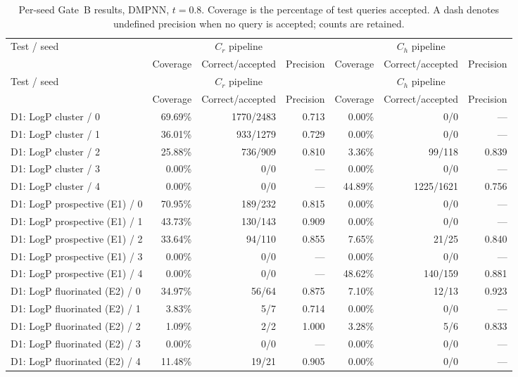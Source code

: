 \begin{longtable}{@{}lrrrrrr@{}}
\caption{Per-seed Gate~B results, DMPNN, $t=0.8$. Coverage is the percentage of test queries accepted. A dash denotes undefined precision when no query is accepted; counts are retained.}\\
\toprule
Test / seed & \multicolumn{3}{c}{$C_r$ pipeline} & \multicolumn{3}{c}{$C_h$ pipeline} \\
 & Coverage & Correct/accepted & Precision & Coverage & Correct/accepted & Precision \\
\midrule
\endfirsthead
\toprule
Test / seed & \multicolumn{3}{c}{$C_r$ pipeline} & \multicolumn{3}{c}{$C_h$ pipeline} \\
 & Coverage & Correct/accepted & Precision & Coverage & Correct/accepted & Precision \\
\midrule
\endhead
\bottomrule
\endfoot
D1: LogP cluster / 0 & 69.69\% & 1770/2483 & 0.713 & 0.00\% & 0/0 & --- \\
D1: LogP cluster / 1 & 36.01\% & 933/1279 & 0.729 & 0.00\% & 0/0 & --- \\
D1: LogP cluster / 2 & 25.88\% & 736/909 & 0.810 & 3.36\% & 99/118 & 0.839 \\
D1: LogP cluster / 3 & 0.00\% & 0/0 & --- & 0.00\% & 0/0 & --- \\
D1: LogP cluster / 4 & 0.00\% & 0/0 & --- & 44.89\% & 1225/1621 & 0.756 \\
\addlinespace
D1: LogP prospective (E1) / 0 & 70.95\% & 189/232 & 0.815 & 0.00\% & 0/0 & --- \\
D1: LogP prospective (E1) / 1 & 43.73\% & 130/143 & 0.909 & 0.00\% & 0/0 & --- \\
D1: LogP prospective (E1) / 2 & 33.64\% & 94/110 & 0.855 & 7.65\% & 21/25 & 0.840 \\
D1: LogP prospective (E1) / 3 & 0.00\% & 0/0 & --- & 0.00\% & 0/0 & --- \\
D1: LogP prospective (E1) / 4 & 0.00\% & 0/0 & --- & 48.62\% & 140/159 & 0.881 \\
\addlinespace
D1: LogP fluorinated (E2) / 0 & 34.97\% & 56/64 & 0.875 & 7.10\% & 12/13 & 0.923 \\
D1: LogP fluorinated (E2) / 1 & 3.83\% & 5/7 & 0.714 & 0.00\% & 0/0 & --- \\
D1: LogP fluorinated (E2) / 2 & 1.09\% & 2/2 & 1.000 & 3.28\% & 5/6 & 0.833 \\
D1: LogP fluorinated (E2) / 3 & 0.00\% & 0/0 & --- & 0.00\% & 0/0 & --- \\
D1: LogP fluorinated (E2) / 4 & 11.48\% & 19/21 & 0.905 & 0.00\% & 0/0 & --- \\

\end{longtable}
